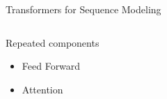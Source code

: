 


\begin{frame}[c]{Transformers for Sequence Modeling}
    \centering
    \begin{columns}
    \begin{column}{0.3\textwidth}
        Repeated components 
        \vspace{0.5cm}
        
            \begin{itemize}
                \item Feed Forward

                \item Attention 
            \end{itemize}
    \end{column}        
    \begin{column}{0.7\textwidth}


\end{column}
\end{columns}
\end{frame}
